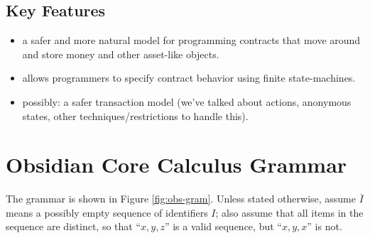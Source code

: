 \documentclass[runningheads,a4paper]{llncs}
\begin{document}
\subsection{Key Features}

\begin{itemize}
\item a safer and more natural model for programming contracts that move around and store money and other asset-like objects.
\item allows programmers to specify contract behavior using finite state-machines.
\item possibly: a safer transaction model (we've talked about actions, anonymous states, other techniques/restrictions to handle this).
\end{itemize}

\fi

\section{Obsidian Core Calculus Grammar}

The grammar is shown in Figure \ref{fig:obs-gram}. Unless stated otherwise, assume $\overline{I}$ means a possibly empty sequence of identifiers $I$; also assume that all items in the sequence are distinct, so that ``$x, y, z$'' is a valid sequence, but ``$x, y, x$'' is not.\\

\newcommand{\stateS}{\texttt{state}}
\newcommand{\ownedS}{\texttt{owned}}
\newcommand{\readonlyS}{\texttt{readonly}}
\newcommand{\sharedS}{\texttt{shared}}
\newcommand{\contractS}{\texttt{contract}}
\newcommand{\extcontractS}{\texttt{external\ contract}}
\newcommand{\letS}{\texttt{let}}
\newcommand{\throwS}{\texttt{throw}}
\newcommand{\tryS}{\texttt{try}}
\newcommand{\catchS}{\texttt{catch}}
\newcommand{\thisS}{\texttt{this}}
\newcommand{\inS}{\texttt{in}}
\newcommand{\caseS}{\texttt{case}}
\newcommand{\defaultS}{\texttt{default}}
\newcommand{\newS}{\texttt{new}}
\newcommand{\permS}{\triangleright}
\newcommand{\functionS}{\texttt{function}}
\newcommand{\transactionS}{\texttt{transaction}}
\newcommand{\voidS}{\textsf{void}}
\newcommand{\unpackS}{\texttt{unpack}}
\newcommand{\packS}{\texttt{pack_to}}
\newcommand{\withS}{\texttt{returns}}
\newcommand{\asS}{\texttt{as}}
\newcommand{\ofS}{\texttt{managed_by}}
\newcommand{\trueS}{\textsf{t}}
\newcommand{\falseS}{\textsf{f}}
\newcommand{\constS}{\texttt{const}}
\newcommand{\ifS}{\texttt{if}}
\newcommand{\thenS}{\texttt{then}}
\newcommand{\elseS}{\texttt{else}}
\newcommand{\resS}{\texttt{res}}
\newcommand{\transactionLabelS}{\mathit{TL}}
\newcommand{\methDeclS}{\mathit{MethDecl}}
\newcommand{\methBodyS}{\mathit{MethBody}}
\end{document}
